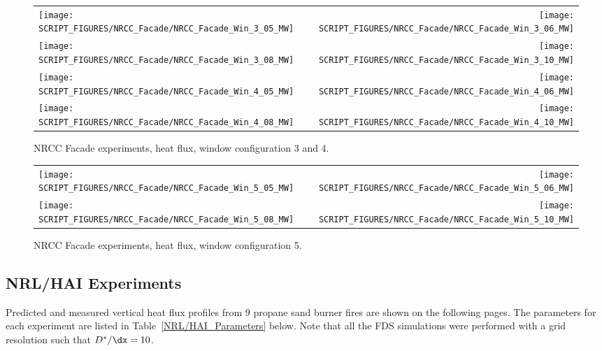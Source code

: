 \begin{figure}[p]
\begin{tabular*}{\textwidth}{l@{\extracolsep{\fill}}r}
\texttt{[image: SCRIPT\_FIGURES/NRCC\_Facade/NRCC\_Facade\_Win\_3\_05\_MW]} &
\texttt{[image: SCRIPT\_FIGURES/NRCC\_Facade/NRCC\_Facade\_Win\_3\_06\_MW]} \\
\texttt{[image: SCRIPT\_FIGURES/NRCC\_Facade/NRCC\_Facade\_Win\_3\_08\_MW]} &
\texttt{[image: SCRIPT\_FIGURES/NRCC\_Facade/NRCC\_Facade\_Win\_3\_10\_MW]} \\
\texttt{[image: SCRIPT\_FIGURES/NRCC\_Facade/NRCC\_Facade\_Win\_4\_05\_MW]} &
\texttt{[image: SCRIPT\_FIGURES/NRCC\_Facade/NRCC\_Facade\_Win\_4\_06\_MW]} \\
\texttt{[image: SCRIPT\_FIGURES/NRCC\_Facade/NRCC\_Facade\_Win\_4\_08\_MW]} &
\texttt{[image: SCRIPT\_FIGURES/NRCC\_Facade/NRCC\_Facade\_Win\_4\_10\_MW]}
\end{tabular*}
\caption[NRCC Facade experiments, heat flux, window configuration 3 and 4]{NRCC Facade experiments, heat flux, window configuration 3 and 4.}
\label{NRCC_Facade_2}
\end{figure}

\begin{figure}[p]
\begin{tabular*}{\textwidth}{l@{\extracolsep{\fill}}r}
\texttt{[image: SCRIPT\_FIGURES/NRCC\_Facade/NRCC\_Facade\_Win\_5\_05\_MW]} &
\texttt{[image: SCRIPT\_FIGURES/NRCC\_Facade/NRCC\_Facade\_Win\_5\_06\_MW]} \\
\texttt{[image: SCRIPT\_FIGURES/NRCC\_Facade/NRCC\_Facade\_Win\_5\_08\_MW]} &
\texttt{[image: SCRIPT\_FIGURES/NRCC\_Facade/NRCC\_Facade\_Win\_5\_10\_MW]}
\end{tabular*}
\caption[NRCC Facade experiments, heat flux, window configuration 5]{NRCC Facade experiments, heat flux, window configuration 5.}
\label{NRCC_Facade_3}
\end{figure}


\clearpage



\subsection{NRL/HAI Experiments}

Predicted and measured vertical heat flux profiles from 9 propane sand burner fires are shown on the following pages. The parameters for each
experiment are listed in Table~\ref{NRL/HAI_Parameters} below. Note that all the FDS simulations were performed with a grid resolution such that
$D^*/\dx=10$.

